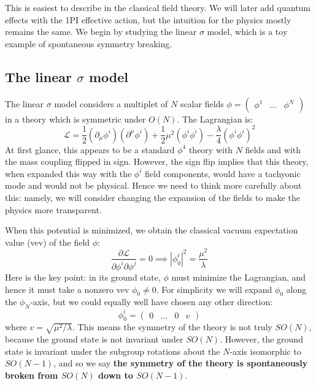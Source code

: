\documentclass[11pt, oneside]{article}   	%
\theoremstyle{definition}
\numberwithin{equation}{subsection}		%
\begin{document}
This is easiest to describe in the classical field theory. We will later add quantum effects with the 1PI effective action, but 
the intuition for the physics mostly remains the same. We begin by studying the linear $\sigma$ model, which is a toy example 
of spontaneous symmetry breaking. 

\subsection{The linear $\sigma$ model}

The linear $\sigma$ model considers a multiplet of $N$ scalar fields $\phi = \begin{pmatrix} \phi^1 & ... & \phi^N\end{pmatrix}$ 
in a theory which is symmetric under $O(N)$. The Lagrangian is:
\begin{equation}
	\mathcal{L} = \frac{1}{2} (\partial_\mu\phi^i)(\partial^\mu\phi^i) + \frac{1}{2}\mu^2 (\phi^i\phi^i) - \frac{\lambda}{4} (\phi^i 
	\phi^i)^2
\end{equation}
At first glance, this appears to be a standard $\phi^4$ theory with $N$ fields and with the mass coupling flipped in sign. 
However, the sign flip implies that this theory, when expanded this way with the $\phi^i$ field components, would have 
a tachyonic mode and would not be physical. Hence we need to think more carefully about this: namely, we will consider 
changing the expansion of the fields to make the physics more transparent. 

When this potential is minimized, we obtain the classical vacuum expectation value (vev) of the field $\phi$:
\begin{equation}
	\frac{\partial\mathcal{L}}{\partial\phi^i\partial\phi^j} = 0\implies |\phi^i_0|^2 = \frac{\mu^2}{\lambda}
\end{equation}
Here is the key point: in its ground state, $\phi$ must minimize the Lagrangian, and hence it must take a nonzero vev $\phi_0
\neq 0$. For simplicity we will expand $\phi_0$ along the $\phi_N$-axis, but we could equally well have chosen any other 
direction:
\begin{equation}
	\phi_0^i = \begin{pmatrix} 0 & ... & 0 & v\end{pmatrix}
\end{equation}
where $v = \sqrt{\mu^2 / \lambda}$. This means the symmetry of the theory is not truly $SO(N)$, because the ground 
state is not invariant under $SO(N)$. However, the ground state is invariant under the subgroup rotations about the $N$-axis 
isomorphic to $SO(N - 1)$, and so we say \textbf{the symmetry of the theory is spontaneously broken from $SO(N)$ down 
to $SO(N - 1)$}. 
\end{document}
